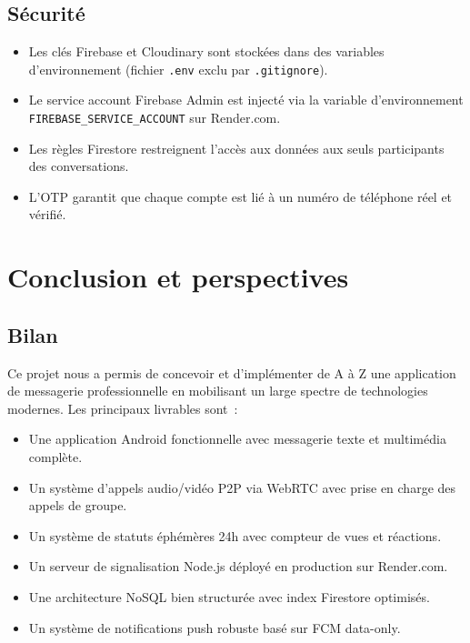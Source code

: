 \documentclass[12pt,a4paper]{report}
\begin{document}
\section{Sécurité}

\begin{itemize}
  \item Les clés Firebase et Cloudinary sont stockées dans des variables d'environnement (fichier \texttt{.env} exclu par \texttt{.gitignore}).
  \item Le service account Firebase Admin est injecté via la variable d'environnement \texttt{FIREBASE\_SERVICE\_ACCOUNT} sur Render.com.
  \item Les règles Firestore restreignent l'accès aux données aux seuls participants des conversations.
  \item L'OTP garantit que chaque compte est lié à un numéro de téléphone réel et vérifié.
\end{itemize}

\chapter{Conclusion et perspectives}

\section{Bilan}

Ce projet nous a permis de concevoir et d'implémenter de A à Z une application de messagerie professionnelle en mobilisant un large spectre de technologies modernes. Les principaux livrables sont~:

\begin{itemize}
  \item Une application Android fonctionnelle avec messagerie texte et multimédia complète.
  \item Un système d'appels audio/vidéo P2P via WebRTC avec prise en charge des appels de groupe.
  \item Un système de statuts éphémères 24h avec compteur de vues et réactions.
  \item Un serveur de signalisation Node.js déployé en production sur Render.com.
  \item Une architecture NoSQL bien structurée avec index Firestore optimisés.
  \item Un système de notifications push robuste basé sur FCM data-only.
\end{itemize}
\end{document}
